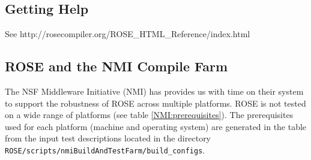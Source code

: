 \subsection{Getting Help}

%

See http://rosecompiler.org/ROSE\_HTML\_Reference/index.html


\subsection{ROSE and the NMI Compile Farm}
\label{NMI_testing}

   The NSF Middleware Initiative (NMI) has provides us with 
time on their system to support the robustness of ROSE across
multiple platforms.  ROSE is not tested on a wide range of platforms
(see table \ref{NMI:prerequisites}).  The prerequisites
used for each platform (machine and operating system) are generated
in the table from the input test descriptions located in the 
directory {\tt ROSE/scripts/nmiBuildAndTestFarm/build\_configs}.

